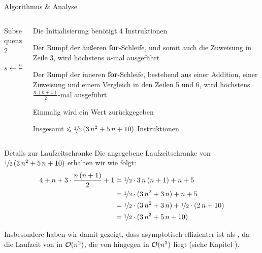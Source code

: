 \begin{frame}{Algorithmus \& Analyse}
\begin{columns}[T,onlytextwidth]
\begin{column}{0.43\textwidth}
\vspace{-5pt}
\begin{algorithm}[H]
	\caption{Subsequenz 2}
	\label{alg:subseq_part_2}
	\DontPrintSemicolon
	$s \gets \frac{n \, (n+1)}{4}$\;
    \Return{\False}
\end{algorithm}
\end{column}
\begin{column}{0.51\textwidth}
    Die Initialisierung ben\"otigt 4 Instruktionen
    
    \medskip
    
    Der Rumpf der \"au{\ss}eren \textbf{for}-Schleife, und somit auch die Zuweisung in Zeile 3, wird h\"ochstens $n$-mal ausgef\"uhrt
    
    \medskip
    
    Der Rumpf der inneren \textbf{for}-Schleife, bestehend aus einer Addition, einer Zuweisung und einem Vergleich in den Zeilen 5 und 6, wird h\"ochstens $\frac{n \, (n+1)}{2}$-mal ausgef\"uhrt
    
    \medskip
    
    Einmalig wird ein Wert zur\"uckgegeben
    
    \medskip
    
    Insgesamt $\leq \nicefrac{1}{2} \, (3 \, n^2 + 5 \, n + 10)$ Instruktionen
\end{column}
\end{columns}
\end{frame}

\begin{frame}{Details zur Laufzeitschranke}
    Die angegebene Laufzeitschranke von $\nicefrac{1}{2} \, (3 \, n^2 + 5 \, n + 10)$ erhalten wir wie folgt:
    \begin{align*}
        4 + n + 3 \cdot \frac{n \, (n+1)}{2} + 1 &= \nicefrac{1}{2} \cdot 3 \, n \, (n+1) + n + 5 \\
        &= \nicefrac{1}{2} \cdot (3 \, n^2 + 3\, n) + n + 5 \\
        &= \nicefrac{1}{2} \cdot (3 \, n^2 + 3\, n) + \nicefrac{1}{2} \cdot (2 \, n + 10) \\
        &= \nicefrac{1}{2} \cdot (3 \, n^2 + 5\, n + 10)
    \end{align*}

    \begin{remark}
    Insbesondere haben wir damit gezeigt, dass  \alert{asymptotisch effizienter} ist als , da die Laufzeit von  in $\bigO(n^2)$, die von   hingegen in $\bigO(n^3)$ liegt (siehe Kapitel ).
    \end{remark}
\end{frame}
